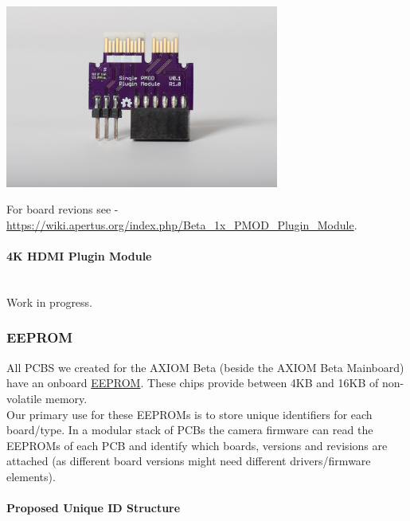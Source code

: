 \begin{center}
\includegraphics[height=6cm]{images/1xpmodtop}
\end{center}


For board revions see - \href{https://wiki.apertus.org/index.php/Beta_1x_PMOD_Plugin_Module}{https://wiki.apertus.org/index.php/Beta_1x_PMOD_Plugin_Module}.\\



\paragraph{4K HDMI Plugin Module}\\

Work in progress.









\subsubsection{EEPROM}

All PCBS we created for the AXIOM Beta (beside the AXIOM Beta Mainboard) have an onboard \href{https://en.wikipedia.org/wiki/EEPROM}{EEPROM}. These chips provide between 4KB and 16KB of non-volatile memory.\\

Our primary use for these EEPROMs is to store unique identifiers for each board/type. In a modular stack of PCBs the camera firmware can read the EEPROMs of each PCB and identify which boards, versions and revisions are attached (as different board versions might need different drivers/firmware elements).\\

\paragraph{Proposed Unique ID Structure}\\

